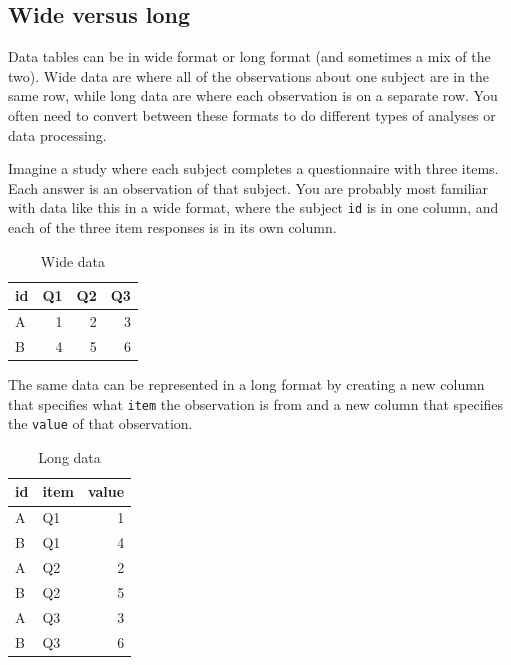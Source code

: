 \documentclass[
  oneside]{book}
\begin{document}
\hypertarget{wide_long}{%
\subsection{Wide versus long}\label{wide_long}}

Data tables can be in wide format or long format (and sometimes a mix of the two). Wide data are where all of the observations about one subject are in the same row, while long data are where each observation is on a separate row. You often need to convert between these formats to do different types of analyses or data processing.

Imagine a study where each subject completes a questionnaire with three items. Each answer is an observation of that subject. You are probably most familiar with data like this in a wide format, where the subject \texttt{id} is in one column, and each of the three item responses is in its own column.

\begin{table}

\caption{\label{tab:wide-data}Wide data}
\centering
\begin{tabular}[t]{l|r|r|r}
\hline
id & Q1 & Q2 & Q3\\
\hline
A & 1 & 2 & 3\\
\hline
B & 4 & 5 & 6\\
\hline
\end{tabular}
\end{table}

The same data can be represented in a long format by creating a new column that specifies what \texttt{item} the observation is from and a new column that specifies the \texttt{value} of that observation.

\begin{table}

\caption{\label{tab:long-data}Long data}
\centering
\begin{tabular}[t]{l|l|r}
\hline
id & item & value\\
\hline
A & Q1 & 1\\
\hline
B & Q1 & 4\\
\hline
A & Q2 & 2\\
\hline
B & Q2 & 5\\
\hline
A & Q3 & 3\\
\hline
B & Q3 & 6\\
\hline
\end{tabular}
\end{table}
\end{document}
